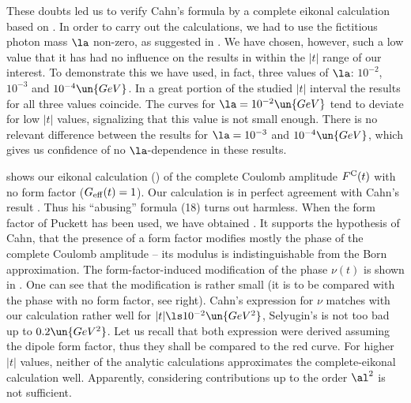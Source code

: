 These doubts led us to verify Cahn's formula by a complete eikonal calculation based on . In order to carry out the calculations, we had to use the fictitious photon mass $\la$ non-zero, as suggested in . We have chosen, however, such a low value that it has had no influence on the results in within the $|t|$ range of our interest. To demonstrate this we have used, in fact, three values of $\la$: $10^{-2}$, $10^{-3}$ and $10^{-4}\un{GeV}$. In a great portion of the studied $|t|$ interval the results for all three values coincide. The curves for $\la = 10^{-2} \un{GeV}$ tend to deviate for low $|t|$ values, signalizing that this value is not small enough. There is no relevant difference between the results for $\la = 10^{-3}$ and $10^{-4}\un{GeV}$, which gives us confidence of no $\la$-dependence in these results.

 shows our eikonal calculation () of the complete Coulomb amplitude $F^{\rm C}(t)$ with no form factor ($G_{\rm eff}(t) = 1$). Our calculation is in perfect agreement with Cahn's result . Thus his ``abusing'' formula (18) turns out harmless. When the form factor of Puckett has been used, we have obtained . It supports the hypothesis of Cahn, that the presence of a form factor modifies mostly the phase of the complete Coulomb amplitude -- its modulus is indistinguishable from the Born approximation. The form-factor-induced modification of the phase $\nu(t)$ is shown in . One can see that the modification is rather small (it is to be compared with the phase with no form factor, see  right). Cahn's expression for $\nu$ matches with our calculation rather well for $|t| \ls 10^{-2}\un{GeV^2}$, Selyugin's is not too bad up to $0.2\un{GeV^2}$. Let us recall that both expression were derived assuming the dipole form factor, thus they shall be compared to the red curve. For higher $|t|$ values, neither of the analytic calculations approximates the complete-eikonal calculation well. Apparently, considering contributions up to the order $\al^2$ is not sufficient.


